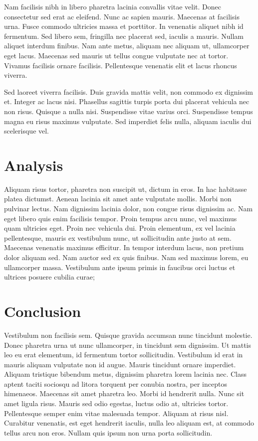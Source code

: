 \documentclass[a4paper,12pt]{article}
\begin{document}
\begin{multicols}{2}
		Nam facilisis nibh in libero pharetra lacinia convallis vitae velit. Donec consectetur sed erat ac eleifend. Nunc ac sapien mauris. Maecenas at facilisis urna. Fusce commodo ultricies massa et porttitor. In venenatis aliquet nibh id fermentum. Sed libero sem, fringilla nec placerat sed, iaculis a mauris. Nullam aliquet interdum finibus. Nam ante metus, aliquam nec aliquam ut, ullamcorper eget lacus. Maecenas sed mauris ut tellus congue vulputate nec at tortor. Vivamus facilisis ornare facilisis. Pellentesque venenatis elit et lacus rhoncus viverra.
		
		Sed laoreet viverra facilisis. Duis gravida mattis velit, non commodo ex dignissim et. Integer ac lacus nisi. Phasellus sagittis turpis porta dui placerat vehicula nec non risus. Quisque a nulla nisi. Suspendisse vitae varius orci. Suspendisse tempus magna eu risus maximus vulputate. Sed imperdiet felis nulla, aliquam iaculis dui scelerisque vel.
		
	\section{Analysis}
		Aliquam risus tortor, pharetra non suscipit ut, dictum in eros. In hac habitasse platea dictumst. Aenean lacinia sit amet ante vulputate mollis. Morbi non pulvinar lectus. Nam dignissim lacinia dolor, non congue risus dignissim ac. Nam eget libero quis enim facilisis tempor. Proin tempus arcu nunc, vel maximus quam ultricies eget. Proin nec vehicula dui. Proin elementum, ex vel lacinia pellentesque, mauris ex vestibulum nunc, ut sollicitudin ante justo at sem. Maecenas venenatis maximus efficitur. In tempor interdum lacus, non pretium dolor aliquam sed. Nam auctor sed ex quis finibus. Nam sed maximus lorem, eu ullamcorper massa. Vestibulum ante ipsum primis in faucibus orci luctus et ultrices posuere cubilia curae;
		
\newpage
	\figurename
	
	\section{Conclusion}
		Vestibulum non facilisis sem. Quisque gravida accumsan nunc tincidunt molestie. Donec pharetra urna ut nunc ullamcorper, in tincidunt sem dignissim. Ut mattis leo eu erat elementum, id fermentum tortor sollicitudin. Vestibulum id erat in mauris aliquam vulputate non id augue. Mauris tincidunt ornare imperdiet. Aliquam tristique bibendum metus, dignissim pharetra lorem lacinia nec. Class aptent taciti sociosqu ad litora torquent per conubia nostra, per inceptos himenaeos. Maecenas sit amet pharetra leo. Morbi id hendrerit nulla. Nunc sit amet ligula risus. Mauris sed odio egestas, luctus odio at, ultricies tortor. Pellentesque semper enim vitae malesuada tempor. Aliquam at risus nisl. Curabitur venenatis, est eget hendrerit iaculis, nulla leo aliquam est, at commodo tellus arcu non eros. Nullam quis ipsum non urna porta sollicitudin.
		
\end{multicols}
\end{document}
